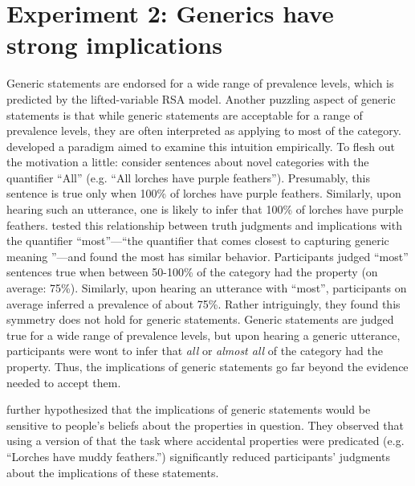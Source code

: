 \documentclass[10pt,letterpaper]{article}
\begin{document}
\section{Experiment 2: Generics have strong implications}

Generic statements are endorsed for a wide range of prevalence levels, which is predicted by the lifted-variable RSA model. Another puzzling aspect of generic statements is that while generic statements are acceptable for a range of prevalence levels, they are often interpreted as applying to most of the category.   developed a paradigm aimed to examine this intuition empirically. To flesh out the motivation a little: consider sentences about novel categories with the quantifier ``All'' (e.g. ``All lorches have purple feathers''). Presumably, this sentence is true only when 100\% of lorches have purple feathers. Similarly, upon hearing such an utterance, one is likely to infer that 100\% of lorches have purple feathers.   tested this relationship between truth judgments and implications with the quantifier ``most''---``the quantifier that comes closest to capturing generic meaning \cite{Carlson1977,Cimpian2010b}''---and found the most has similar behavior. Participants judged ``most'' sentences true when between 50-100\% of the category had the property (on average: 75\%). Similarly, upon hearing an utterance with ``most'', participants on average inferred a prevalence of about 75\%. Rather intriguingly, they found this symmetry does not hold for generic statements. Generic statements are judged true for a wide range of prevalence levels, but upon hearing a generic utterance, participants were wont to infer that \emph{all} or \emph{almost all} of the category had the property. Thus, the implications of generic statements go far beyond the evidence needed to accept them.

  further hypothesized that the implications of generic statements would be sensitive to people's beliefs about the properties in question. They observed that using a version of that the task where accidental properties were predicated (e.g. ``Lorches have muddy feathers.'') significantly reduced participants' judgments about the implications of these statements.


\end{document}

